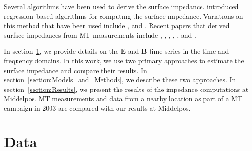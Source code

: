 \documentclass[pdflatex,sn-basic]{sn-jnl}%
\begin{document}

Several algorithms have been used to derive the surface impedance. \cite{Sims1971} introduced regression--based algorithms for computing the surface impedance. Variations on this method that have been used include \cite{Egbert1997,Egbert2011,Jones1989,Chave2012}, and \cite{Larsen1996}. Recent papers that derived surface impedances from MT measurements include \cite{Jones1989}, \cite{Moorkamp2007}, \cite{Fujii2015}, \cite{Heyns2020}, \cite{Weigel2019}, and \cite{Chen2021}.


In section~\ref{section:Data}, we provide details on the $\mathbf{E}$ and $\mathbf{B}$ time series in the time and frequency domains. In this work, we use two primary approaches to estimate the surface impedance and compare their results. In section~\ref{section:Models_and_Methods}, we describe these two approaches. In section~\ref{section:Results}, we present the results of the impedance computations at Middelpos. MT measurements and data from a nearby location as part of a MT campaign in 2003 are compared with our results at Middelpos.


\section{Data}
\label{section:Data}
\end{document}
